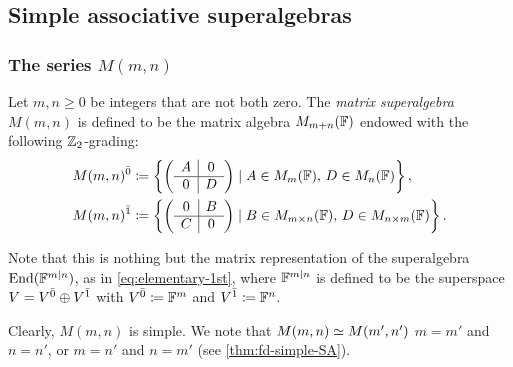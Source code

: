 \subsection{Simple associative superalgebras}\label{subsec:simple-associative}

\subsubsection{The series \texorpdfstring{$M(m,n)$}{M(m,n)}}

Let $m, n \geq 0$ be integers that are not both zero.
The \emph{matrix superalgebra} $M(m,n)$ is defined to be the matrix algebra $M_{m+n}(\mathbb{F})$ endowed with the following $\mathbb{Z}_2$-grading:
%
\begin{align}
    M(m,n)^{\bar0} &\coloneqq \left\{ \left(\begin{array}{c|c}
        A & 0\\
        \hline
        0 & D
    \end{array}\right)
    \mid A\in M_{m}(\mathbb{F}),\, D\in M_n(\mathbb{F}) \right\},\\
    M(m,n)^{\bar1} &\coloneqq \left\{
    \left(\begin{array}{c|c}
        0 & B\\
        \hline
        C & 0
    \end{array}\right)
    \mid B \in M_{m\times n}(\mathbb{F}), \, D\in M_{n\times m}(\mathbb{F}) \right\}.
\end{align}
%
\label{def:grd-superspace-canonical}

Note that this is nothing but the matrix representation of the superalgebra $\operatorname{End}(\mathbb{F}^{m|n})$, as in \cref{eq:elementary-1st}, where $\mathbb{F}^{m|n}$ is defined to be the superspace $V = V^{\bar0} \oplus V^{\bar1}$ with $V^{\bar0} \coloneqq \mathbb{F}^m$ and $V^{\bar1} \coloneqq \mathbb{F}^n$. 

% 
Clearly, $M(m,n)$ is simple. 
We note that $M(m,n) \simeq M(m',n')$ \IFF $m=m'$ and $n=n'$, or $m=n'$ and $n=m'$ (see \cref{thm:fd-simple-SA}). 

